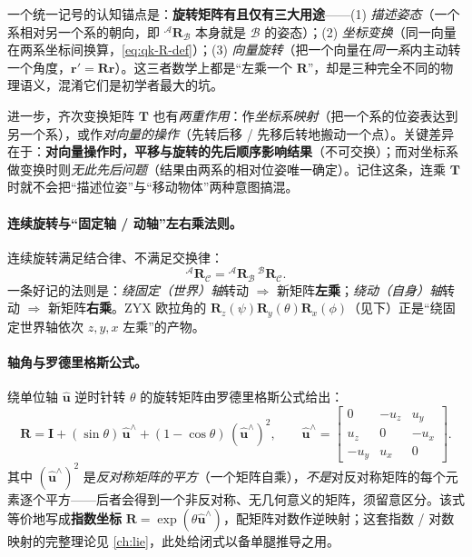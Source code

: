 \begin{insight}\label{ins:qk-three-uses}
一个统一记号的认知锚点是：\textbf{旋转矩阵有且仅有三大用途}——(1) \emph{描述姿态}（一个系相对另一个系的朝向，即 ${}^{\mathcal{A}}\mathbf{R}_{\mathcal{B}}$ 本身就是 $\mathcal{B}$ 的姿态）；(2) \emph{坐标变换}（同一向量在两系坐标间换算，\cref{eq:qk-R-def}）；(3) \emph{向量旋转}（把一个向量在\emph{同一系}内主动转一个角度，$\boldsymbol{r}'=\mathbf{R}\boldsymbol{r}$）。这三者数学上都是“左乘一个 $\mathbf{R}$”，却是三种完全不同的物理语义，混淆它们是初学者最大的坑。

进一步，齐次变换矩阵 $\mathbf{T}$ 也有\emph{两重作用}：作\emph{坐标系映射}（把一个系的位姿表达到另一个系），或作\emph{对向量的操作}（先转后移 / 先移后转地搬动一个点）。关键差异在于：\textbf{对向量操作时，平移与旋转的先后顺序影响结果}（不可交换）；而对坐标系做变换时则\emph{无此先后问题}（结果由两系的相对位姿唯一确定）。记住这条，连乘 $\mathbf{T}$ 时就不会把“描述位姿”与“移动物体”两种意图搞混。
\end{insight}

\paragraph{连续旋转与“固定轴 / 动轴”左右乘法则。}
连续旋转满足结合律、不满足交换律\cite{yu2021quadruped,unitree2023quadruped}：
\begin{equation}
  {}^{\mathcal{A}}\mathbf{R}_{\mathcal{C}}={}^{\mathcal{A}}\mathbf{R}_{\mathcal{B}}\,{}^{\mathcal{B}}\mathbf{R}_{\mathcal{C}}.
  \label{eq:qk-R-compose}
\end{equation}
一条好记的法则是\cite{unitree2023quadruped}：\emph{绕固定（世界）轴}转动 $\Rightarrow$ 新矩阵\textbf{左乘}；\emph{绕动（自身）轴}转动 $\Rightarrow$ 新矩阵\textbf{右乘}。ZYX 欧拉角的 $\mathbf{R}_z(\psi)\mathbf{R}_y(\theta)\mathbf{R}_x(\phi)$（见下）正是“绕固定世界轴依次 $z,y,x$ 左乘”的产物。

\paragraph{轴角与罗德里格斯公式。}
绕单位轴 $\hat{\boldsymbol{u}}$ 逆时针转 $\theta$ 的旋转矩阵由罗德里格斯公式给出\cite{yu2021quadruped}：
\begin{equation}
  \mathbf{R}=\mathbf{I}+(\sin\theta)\,\hat{\boldsymbol{u}}^{\wedge}+(1-\cos\theta)\,(\hat{\boldsymbol{u}}^{\wedge})^2,
  \qquad
  \hat{\boldsymbol{u}}^{\wedge}=\begin{bmatrix}0&-u_z&u_y\\u_z&0&-u_x\\-u_y&u_x&0\end{bmatrix}.
  \label{eq:qk-rodrigues}
\end{equation}
其中 $(\hat{\boldsymbol{u}}^{\wedge})^2$ 是\emph{反对称矩阵的平方}（一个矩阵自乘），\emph{不是}对反对称矩阵的每个元素逐个平方——后者会得到一个非反对称、无几何意义的矩阵，须留意区分。该式等价地写成\textbf{指数坐标} $\mathbf{R}=\exp(\theta\hat{\boldsymbol{u}}^{\wedge})$，配矩阵对数作逆映射\cite{unitree2023quadruped}；这套指数 / 对数映射的完整理论见 \cref{ch:lie}，此处给闭式以备单腿推导之用。

